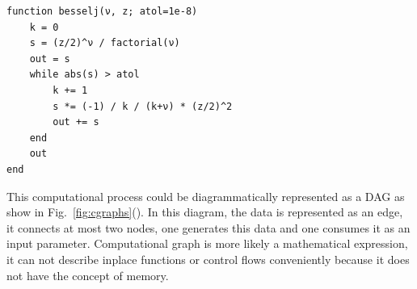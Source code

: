 \documentclass[aps,twocolumn,longbibliography,english,superscriptaddress]{revtex4-1}
\newcommand{\<}{\langle}
\renewcommand{\>}{\rangle}
\newcommand{\Fig}[1]{Fig.~\ref{#1}}
\theoremstyle{definition}\newtheorem{definition}{\textit{Definition}}
\begin{document}
\begin{minipage}{.44\textwidth}
\begin{lstlisting}
function besselj(ν, z; atol=1e-8)
    k = 0
    s = (z/2)^ν / factorial(ν)
    out = s
    while abs(s) > atol
        k += 1
        s *= (-1) / k / (k+ν) * (z/2)^2
        out += s
    end
    out
end
\end{lstlisting}
\end{minipage}

This computational process could be diagrammatically represented as a DAG as show in \Fig{fig:cgraphs}().
In this diagram, the data is represented as an edge, it connects at most two nodes, one generates this data and one consumes it as an input parameter.
Computational graph is more likely a mathematical expression, it can not describe inplace functions or control flows conveniently because it does not have the concept of memory.
\end{document}
